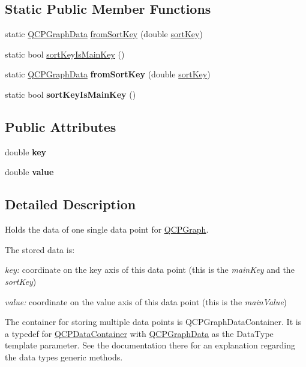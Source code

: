 \subsection*{Static Public Member Functions}
\begin{DoxyCompactItemize}
\item 
static \hyperlink{class_q_c_p_graph_data}{Q\+C\+P\+Graph\+Data} \hyperlink{class_q_c_p_graph_data_a4646eac7f7a48970ea0fc5153aab0e77}{from\+Sort\+Key} (double \hyperlink{class_q_c_p_graph_data_a5e0f37ea101eeec245d8c32a2206b204}{sort\+Key})
\item 
static bool \hyperlink{class_q_c_p_graph_data_a1c98dfd21b82321a173db4ff860dfd21}{sort\+Key\+Is\+Main\+Key} ()
\item 
\mbox{\label{class_q_c_p_graph_data_a4646eac7f7a48970ea0fc5153aab0e77}} 
static \hyperlink{class_q_c_p_graph_data}{Q\+C\+P\+Graph\+Data} {\bfseries from\+Sort\+Key} (double \hyperlink{class_q_c_p_graph_data_a5e0f37ea101eeec245d8c32a2206b204}{sort\+Key})
\item 
\mbox{\label{class_q_c_p_graph_data_a61da5d975de269a23d98ad18bc4f4ab3}} 
static bool {\bfseries sort\+Key\+Is\+Main\+Key} ()
\end{DoxyCompactItemize}
\subsection*{Public Attributes}
\begin{DoxyCompactItemize}
\item 
\mbox{\label{class_q_c_p_graph_data_a2fcebdf84af975761c0661237d7e28ec}} 
double {\bfseries key}
\item 
\mbox{\label{class_q_c_p_graph_data_ac97e3ddbdcbe0b58d0b4d6f95250d59c}} 
double {\bfseries value}
\end{DoxyCompactItemize}


\subsection{Detailed Description}
Holds the data of one single data point for \hyperlink{class_q_c_p_graph}{Q\+C\+P\+Graph}. 

The stored data is\+: \begin{DoxyItemize}
\item {\itshape key\+:} coordinate on the key axis of this data point (this is the {\itshape main\+Key} and the {\itshape sort\+Key}) \item {\itshape value\+:} coordinate on the value axis of this data point (this is the {\itshape main\+Value})\end{DoxyItemize}
The container for storing multiple data points is Q\+C\+P\+Graph\+Data\+Container. It is a typedef for \hyperlink{class_q_c_p_data_container}{Q\+C\+P\+Data\+Container} with \hyperlink{class_q_c_p_graph_data}{Q\+C\+P\+Graph\+Data} as the Data\+Type template parameter. See the documentation there for an explanation regarding the data type\textquotesingle{}s generic methods.

